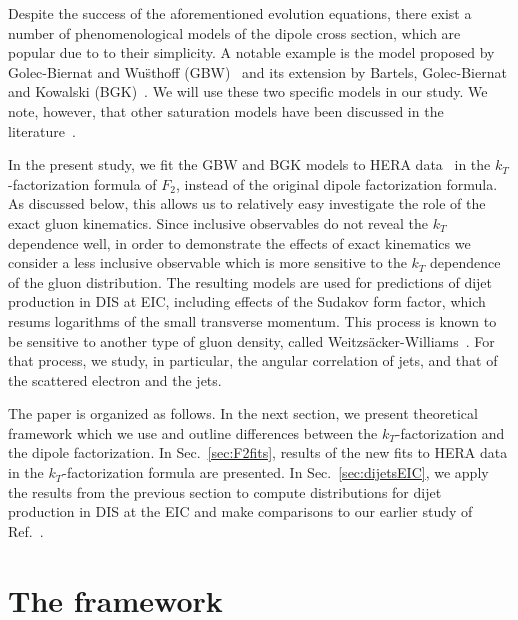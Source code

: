 \documentclass[11pt]{article}
\begin{document}
Despite the success of the aforementioned evolution equations, there exist a
number of phenomenological models of the dipole cross section, which are popular
due to to their simplicity.  A notable example is the model proposed by
Golec-Biernat and Wu\"sthoff (GBW)~\cite{Golec-Biernat:1998zce} and its
extension by Bartels, Golec-Biernat and Kowalski (BGK)~\cite{Bartels:2002cj}. We
will use these two specific models in our study. We note, however, that other
saturation models have been discussed in the
literature~\cite{Kowalski:2003hm,McLerran:1993ni,Forshaw:1999uf,Iancu:2003ge}.

In the present study, we fit the GBW and BGK models to HERA
data~\cite{Abt:2017nkc} in the $k_T$-factorization formula of $F_2$, instead of
the original dipole factorization formula. As discussed below, this allows us to relatively easy investigate the role 
of the  exact gluon kinematics.  Since inclusive observables do not
reveal the $k_T$ dependence well, in order to demonstrate the effects of exact kinematics we consider a less inclusive observable
which is more sensitive to the $k_T$ dependence of the gluon distribution.  The
resulting models are used for predictions of dijet production in DIS at EIC,
including effects of the Sudakov form factor, which resums logarithms of the
small transverse momentum. 
%
This process is known to be sensitive to another type of gluon density, called
Weitzs\"acker-Williams~\cite{Dominguez:2010xd,Dominguez:2011wm}. For that
process, we study, in particular, the angular correlation of jets, and that of
the scattered electron and the jets.
 
The paper is organized as follows.  In the next section, we present theoretical
framework which we use and outline differences between the $k_T$-factorization
and the dipole factorization.  In Sec.~\ref{sec:F2fits}, results of the new fits
to HERA data in the $k_T$-factorization formula are presented.  In
Sec.~\ref{sec:dijetsEIC}, we apply the results from the previous section to
compute distributions for dijet production in DIS at the EIC and make
comparisons to our earlier study of Ref.~\cite{vanHameren:2021sqc}.

\section{The framework}
\end{document}
